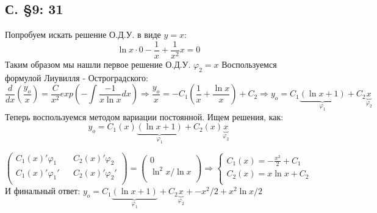 \documentclass{article}
\begin{document}
\subsection{С. \S9: 31 }
Попробуем искать решение О.Д.У. в виде $y=x$:
\begin{equation*}
    \ln x \cdot 0 - \frac{1}{x} + \frac{1}{x^2} x = 0
\end{equation*}
Таким образом мы нашли первое решение О.Д.У. $\varphi_2=x$ Воспользуемся формулой Лиувилля - Остроградского:
\begin{equation}
    \frac{d}{d x} \left( \frac{y_o}{x}\right) = \frac{C}{x^2} exp \left( -\int \frac{-1}{x \ln x} dx  \right) \Rightarrow 
    \frac{y_o}{x} = -C_1 \left(\frac{1}{x} + \frac{\ln x}{x}\right) + C_2 \Rightarrow 
    y_o = C_1\underbrace{(\ln x + 1)}_{\varphi_1} + C_2\underbrace{ x}_{\varphi_2} 
\end{equation}
Теперь воспользуемся методом вариации постоянной. Ищем решения, как:
\begin{equation*}
    y_o = C_1(x)\underbrace{(\ln x + 1)}_{\varphi_1} + C_2(x)\underbrace{ x}_{\varphi_2}
\end{equation*}

\begin{equation}
    \begin{pmatrix}
    C_1(x)' \varphi_1 && C_2(x)' \varphi_2 \\
    C_1(x)' \varphi_1' && C_2(x)' \varphi_2' \\
    \end{pmatrix}
    =
    \begin{pmatrix}
    0\\
    \ln^2 x / \ln x \\
    \end{pmatrix}
    \Rightarrow
    \begin{cases}
    C_1(x)=-\frac{x^2}{2}+C_1\\
    C_2(x)=x \ln x + C_2\\
    \end{cases}
\end{equation}
И финальный ответ: $y_o = C_1\underbrace{(\ln x + 1)}_{\varphi_1} + C_2\underbrace{x}_{\varphi_2}  + 
 - x^2/2+x^2 \ln x /2$
\end{document}
